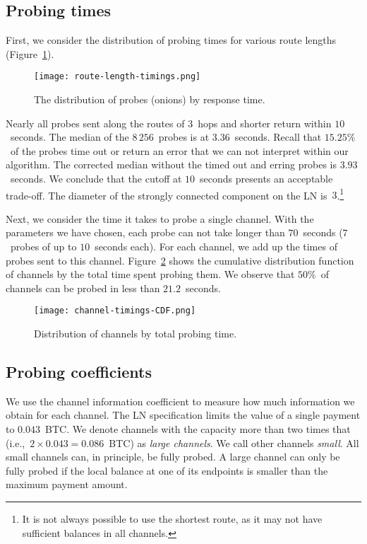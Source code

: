 \subsection{Probing times}

First, we consider the distribution of probing times for various route lengths (Figure~\ref{fig:route-length-timings}).

\begin{figure}[ht]
	\centering
	\texttt{[image: route-length-timings.png]}
	\caption{The distribution of probes (onions) by response time.}
	\label{fig:route-length-timings}
\end{figure}

Nearly all probes sent along the routes of $3$~hops and shorter return within $10$~seconds.
The median of the $8\,256$~probes is at $3.36$~seconds.
Recall that $15.25\%$~of the probes time out or return an error that we can not interpret within our algorithm.
The corrected median without the timed out and erring probes is $3.93$~seconds. 
We conclude that the cutoff at $10$~seconds presents an acceptable trade-off.
The diameter of the strongly connected component on the LN is~$3$.\footnote{It is not always possible to use the shortest route, as it may not have sufficient balances in all channels.}

Next, we consider the time it takes to probe a single channel.
With the parameters we have chosen, each probe can not take longer than $70$~seconds ($7$~probes of up to $10$~seconds each).
For each channel, we add up the times of probes sent to this channel.
Figure~\ref{fig:channel-timings-CDF} shows the cumulative distribution function of channels by the total time spent probing them.
We observe that $50\%$~of channels can be probed in less than $21.2$~seconds.

\begin{figure}[ht]
	\centering
	\texttt{[image: channel-timings-CDF.png]}
	\caption{Distribution of channels by total probing time.}
	\label{fig:channel-timings-CDF}
\end{figure}


\subsection{Probing coefficients}

We use the channel information coefficient to measure how much information we obtain for each channel.
The LN specification limits the value of a single payment to $0.043$~BTC\@.
We denote channels with the capacity more than two times that (i.e.,~$2 \times 0.043 = 0.086$~BTC) as \textit{large channels}.
We call other channels \textit{small}.
All small channels can, in principle, be fully probed.
A large channel can only be fully probed if the local balance at one of its endpoints is smaller than the maximum payment amount.

